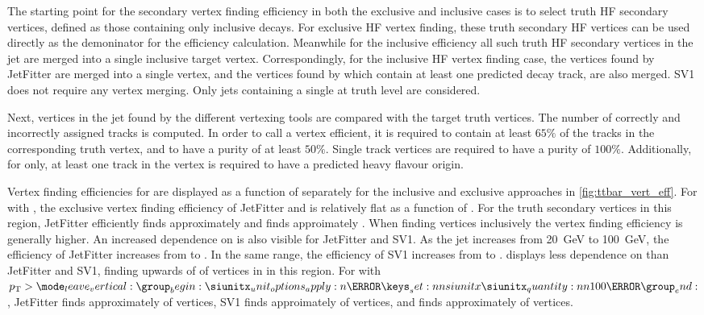 The starting point for the secondary vertex finding efficiency in both the exclusive and inclusive cases is to select truth HF secondary vertices, defined as those containing only inclusive \bhadron decays.
For exclusive HF vertex finding, these truth secondary HF vertices can be used directly as the demoninator for the efficiency calculation.
Meanwhile for the inclusive efficiency all such truth HF secondary vertices in the jet are merged into a single inclusive target vertex.
Correspondingly, for the inclusive HF vertex finding case, the vertices found by JetFitter are merged into a single vertex, and the vertices found by \GNN which contain at least one predicted \bhadron decay track, are also merged.
SV1 does not require any vertex merging.
Only jets containing a single \bhadron at truth level are considered.

Next, vertices in the jet found by the different vertexing tools are compared with the target truth vertices.
The number of correctly and incorrectly assigned tracks is computed.
In order to call a vertex efficient, it is required to contain at least $65\%$ of the tracks in the corresponding truth vertex, and to have a purity of at least $50\%$.
Single track vertices are required to have a purity of $100\%$.
Additionally, for \GNN only, at least one track in the vertex is required to have a predicted heavy flavour origin.



Vertex finding efficiencies for \ttbarbjets are displayed as a function of \pt separately for the inclusive and exclusive approaches in \cref{fig:ttbar_vert_eff}.
For \ttbarbjets with \ttbarpt, the exclusive vertex finding efficiency of JetFitter and \GNN is relatively flat as a function of \pt.
For the truth secondary vertices in this \pt region, JetFitter efficiently finds approximately  and \GNN finds approimately .
When finding vertices inclusively the vertex finding efficiency is generally higher.
An increased dependence on \pt is also visible for JetFitter and SV1. As the jet \pt increases from \SI{20}{\GeV} to \SI{100}{\GeV}, the efficiency of JetFitter increases from  to .
In the same range, the efficiency of SV1 increases from  to .
\GNN displays less dependence on \pt than JetFitter and SV1, finding upwards of  of vertices in \bjets in this \pt region. 
For \bjets with $\pt > \SI{100}{\GeV}$, JetFitter finds approximately  of vertices, SV1 finds approimately  of vertices, and \GNN finds approximately  of vertices.

